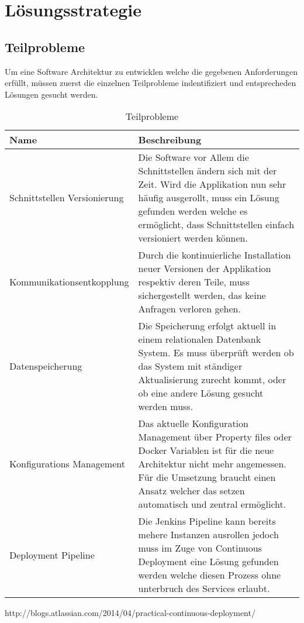 \chapter{Lösungsstrategie}

\section{Teilprobleme}	

Um eine Software Architektur zu entwicklen welche die gegebenen Anforderungen erfüllt, müssen zuerst die einzelnen Teilprobleme indentifiziert und entsprecheden Lösungen gesucht werden.

\begin{table}[H]
	\centering
	\caption{Teilprobleme}
	\begin{tabular}{ | p{4cm} | p{12cm} | }
		\toprule
		{\textbf{Name}} & {\textbf{Beschreibung}} \\
		\midrule
		Schnittstellen Versionierung & Die Software vor Allem die Schnittstellen ändern sich mit der Zeit. Wird die Applikation nun sehr häufig ausgerollt, muss ein Lösung gefunden werden welche es ermöglicht, dass Schnittstellen einfach versioniert werden können.\\ \hline
		Kommunikationsentkopplung &  Durch die kontinuierliche Installation neuer Versionen der Applikation respektiv deren Teile, muss sichergestellt werden, das keine Anfragen verloren gehen.\\ \hline
		Datenspeicherung &  Die Speicherung erfolgt aktuell in einem relationalen Datenbank System. Es muss überprüft werden ob das System mit ständiger Aktualisierung zurecht kommt, oder ob eine andere Lösung gesucht werden muss.\\ \hline
		Konfigurations Management & Das aktuelle Konfiguration Management über Property files oder Docker Variablen ist für die neue Architektur nicht mehr angemessen. Für die Umsetzung braucht einen Ansatz welcher das setzen automatisch und zentral ermöglicht. \\ \hline
		Deployment Pipeline & Die Jenkins Pipeline kann bereits mehere Instanzen ausrollen jedoch muss im Zuge von Continuous Deployment eine Lösung gefunden werden welche diesen Prozess ohne unterbruch des Services erlaubt. \\
		\bottomrule
	\end{tabular}
\end{table}

http://blogs.atlassian.com/2014/04/practical-continuous-deployment/

